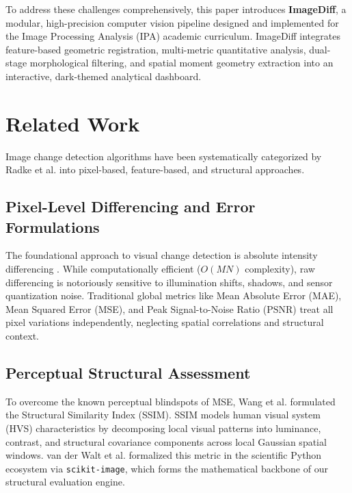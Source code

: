 \documentclass[conference]{IEEEtran}
\begin{document}
To address these challenges comprehensively, this paper introduces \textbf{ImageDiff}, a modular, high-precision computer vision pipeline designed and implemented for the Image Processing Analysis (IPA) academic curriculum. ImageDiff integrates feature-based geometric registration, multi-metric quantitative analysis, dual-stage morphological filtering, and spatial moment geometry extraction into an interactive, dark-themed analytical dashboard.

\section{Related Work}
Image change detection algorithms have been systematically categorized by Radke et al. \cite{radke2005image} into pixel-based, feature-based, and structural approaches.

\subsection{Pixel-Level Differencing and Error Formulations}
The foundational approach to visual change detection is absolute intensity differencing \cite{gonzalez2018digital}. While computationally efficient ($O(MN)$ complexity), raw differencing is notoriously sensitive to illumination shifts, shadows, and sensor quantization noise. Traditional global metrics like Mean Absolute Error (MAE), Mean Squared Error (MSE), and Peak Signal-to-Noise Ratio (PSNR) treat all pixel variations independently, neglecting spatial correlations and structural context.

\subsection{Perceptual Structural Assessment}
To overcome the known perceptual blindspots of MSE, Wang et al. \cite{wang2004image} formulated the Structural Similarity Index (SSIM). SSIM models human visual system (HVS) characteristics by decomposing local visual patterns into luminance, contrast, and structural covariance components across local Gaussian spatial windows. van der Walt et al. \cite{vanderwalt2014scikit} formalized this metric in the scientific Python ecosystem via \texttt{scikit-image}, which forms the mathematical backbone of our structural evaluation engine.
\end{document}
